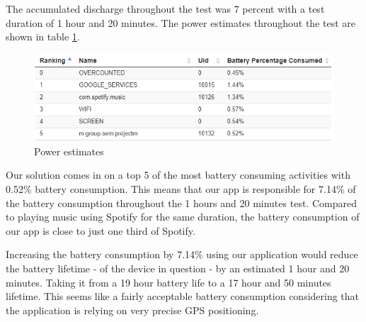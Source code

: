 The accumulated discharge throughout the test was 7 percent with a test duration of 1 hour and 20 minutes. The power estimates throughout the test are shown in table \ref{fig:power_estimates}.


\begin{figure}[H]
\centering
\includegraphics[width=\linewidth]{images/powerestimates}
\caption{Power estimates} 
\label{fig:power_estimates}
\end{figure}

Our solution comes in on a top 5 of the most battery consuming activities with 0.52\% battery consumption. This means that our app is responsible for 7.14\% of the battery consumption throughout the 1 hours and 20 minutes test. Compared to playing music using Spotify for the same duration, the battery consumption of our app is close to just one third of Spotify. 

Increasing the battery consumption by 7.14\% using our application would reduce the battery lifetime - of the device in question - by an estimated 1 hour and 20 minutes. Taking it from a 19 hour battery life to a 17 hour and 50 minutes lifetime. This seems like a fairly acceptable battery consumption considering that the application is relying on very precise GPS positioning. 
